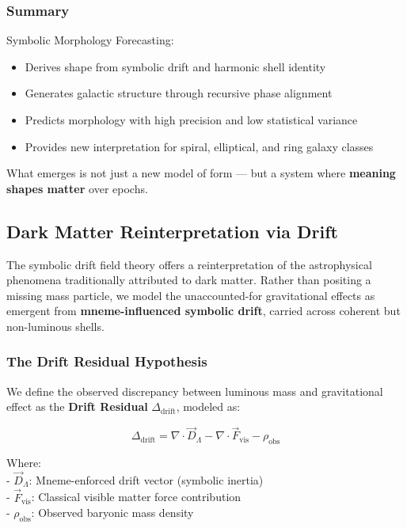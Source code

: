 \documentclass[12pt]{article}
\begin{document}
\subsubsection{Summary}

Symbolic Morphology Forecasting:
\begin{itemize}[noitemsep]
  \item Derives shape from symbolic drift and harmonic shell identity
  \item Generates galactic structure through recursive phase alignment
  \item Predicts morphology with high precision and low statistical variance
  \item Provides new interpretation for spiral, elliptical, and ring galaxy classes
\end{itemize}

What emerges is not just a new model of form — but a system where \textbf{meaning shapes matter} over epochs.

\subsection{Dark Matter Reinterpretation via Drift}

The symbolic drift field theory offers a reinterpretation of the astrophysical phenomena traditionally attributed to dark matter. Rather than positing a missing mass particle, we model the unaccounted-for gravitational effects as emergent from \textbf{mneme-influenced symbolic drift}, carried across coherent but non-luminous shells.

\subsubsection{The Drift Residual Hypothesis}

We define the observed discrepancy between luminous mass and gravitational effect as the \textbf{Drift Residual} \( \Delta_{\text{drift}} \), modeled as:

\[
\Delta_{\text{drift}} = \nabla \cdot \vec{D}_{\Lambda} - \nabla \cdot \vec{F}_{\text{vis}} - \rho_{\text{obs}}
\]

Where:\\
- \( \vec{D}_{\Lambda} \): Mneme-enforced drift vector (symbolic inertia)\\
- \( \vec{F}_{\text{vis}} \): Classical visible matter force contribution\\
- \( \rho_{\text{obs}} \): Observed baryonic mass density\\
\end{document}
